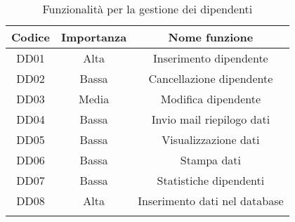 \setlength{\extrarowheight}{7pt}
\begin{longtable}{|c|c|c|}
\hline 
\textbf{Codice} & \textbf{Importanza} & \textbf{Nome funzione}
\tabularnewline
\hline
DD01 &	Alta	&	Inserimento dipendente\tabularnewline
DD02 &	Bassa	&	Cancellazione dipendente\tabularnewline
DD03 &	Media	&	Modifica dipendente\tabularnewline
DD04 &	Bassa	& 	Invio mail riepilogo dati\tabularnewline
DD05 &	Bassa	&	Visualizzazione dati\tabularnewline
DD06 &	Bassa 	& 	Stampa dati\tabularnewline
DD07 &	Bassa	&	Statistiche dipendenti\tabularnewline
DD08 &	Alta	&	Inserimento dati nel database\tabularnewline
\hline
\caption{Funzionalità per la gestione dei dipendenti}
\label{tab:GestioneDipendenti}
\end{longtable}